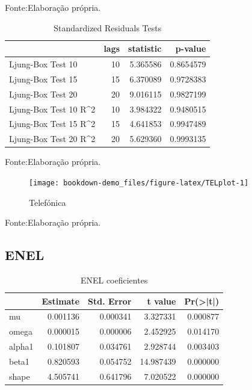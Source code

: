 \documentclass[
  12pt,
  a4paper,
  openany]{book}
\begin{document}
Fonte:Elaboração própria.

\justifying
\bigskip

\begin{table}[!h]

\caption{\label{tab:unnamed-chunk-30}Standardized Residuals Tests}
\centering
\begin{tabular}[t]{lrrr}
\toprule
  & lags & statistic & p-value\\
\midrule
Ljung-Box Test 10 & 10 & 5.365586 & 0.8654579\\
Ljung-Box Test 15 & 15 & 6.370089 & 0.9728383\\
Ljung-Box Test 20 & 20 & 9.016115 & 0.9827199\\
Ljung-Box Test 10 R\textasciicircum{}2 & 10 & 3.984322 & 0.9480515\\
Ljung-Box Test 15 R\textasciicircum{}2 & 15 & 4.641853 & 0.9947489\\
\addlinespace
Ljung-Box Test 20 R\textasciicircum{}2 & 20 & 5.629360 & 0.9993135\\
\bottomrule
\end{tabular}
\end{table}
\FloatBarrier
\centering

Fonte:Elaboração própria.

\justifying
\bigskip
\begin{figure}

{\centering \texttt{[image: bookdown-demo\_files/figure-latex/TELplot-1]} 

}

\caption{Telefónica}\label{fig:TELplot}
\end{figure}
\FloatBarrier
\centering

Fonte:Elaboração própria.

\justifying
\bigskip

\hypertarget{enel}{%
\subsection{ENEL}\label{enel}}

\begin{table}[!h]

\caption{\label{tab:unnamed-chunk-32}ENEL coeficientes}
\centering
\begin{tabular}[t]{lrrrr}
\toprule
  &  Estimate &  Std. Error &  t value & Pr(>|t|)\\
\midrule
mu & 0.001136 & 0.000341 & 3.327331 & 0.000877\\
omega & 0.000015 & 0.000006 & 2.452925 & 0.014170\\
alpha1 & 0.101807 & 0.034761 & 2.928744 & 0.003403\\
beta1 & 0.820593 & 0.054752 & 14.987439 & 0.000000\\
shape & 4.505741 & 0.641796 & 7.020522 & 0.000000\\
\bottomrule
\end{tabular}
\end{table}
\FloatBarrier
\centering
\end{document}
